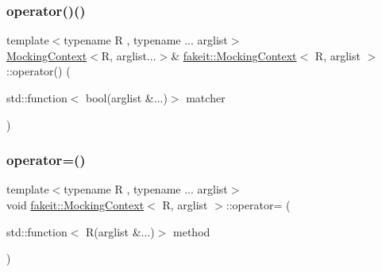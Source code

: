 \mbox{\label{classfakeit_1_1MockingContext_aff3a6b6107f5bc4e028e75bf9b55f313}} 
\subsubsection{\texorpdfstring{operator()()}{operator()()}\hspace{0.1cm}{\footnotesize\ttfamily [18/18]}}
{\footnotesize\ttfamily template$<$typename R , typename ... arglist$>$ \\
\mbox{\hyperlink{classfakeit_1_1MockingContext}{Mocking\+Context}}$<$R, arglist...$>$\& \mbox{\hyperlink{classfakeit_1_1MockingContext}{fakeit\+::\+Mocking\+Context}}$<$ R, arglist $>$\+::operator() (\begin{DoxyParamCaption}\item[{std\+::function$<$ bool(arglist \&...)$>$}]{matcher }\end{DoxyParamCaption})\hspace{0.3cm}{\ttfamily [inline]}}

\mbox{\label{classfakeit_1_1MockingContext_aadefb2bd6c1dee1f3aa8902277dd3fc2}} 
\subsubsection{\texorpdfstring{operator=()}{operator=()}\hspace{0.1cm}{\footnotesize\ttfamily [1/27]}}
{\footnotesize\ttfamily template$<$typename R , typename ... arglist$>$ \\
void \mbox{\hyperlink{classfakeit_1_1MockingContext}{fakeit\+::\+Mocking\+Context}}$<$ R, arglist $>$\+::operator= (\begin{DoxyParamCaption}\item[{std\+::function$<$ R(arglist \&...)$>$}]{method }\end{DoxyParamCaption})\hspace{0.3cm}{\ttfamily [inline]}}

